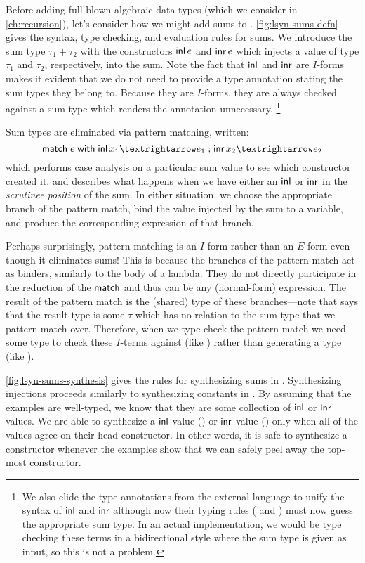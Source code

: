 Before adding full-blown algebraic data types (which we consider in \autoref{ch:recursion}), let's consider how we might add sums to \lsyn{}.
\autoref{fig:lsyn-sums-defn} gives the syntax, type checking, and evaluation rules for sums.
We introduce the sum type $τ_1 + τ_2$ with the constructors $\minl{e}$ and $\minr{e}$ which injects a value of type $τ_1$ and $τ_2$, respectively, into the sum.
Note the fact that $\minl{\!}$ and $\minr{\!}$ are $I$-forms makes it evident that we do not need to provide a type annotation stating the sum types they belong to.
Because they are $I$-forms, they are always checked against a sum type which renders the annotation unnecessary.%
\footnote{%
  We also elide the type annotations from the external language to unify the syntax of $\minl{\!}$ and $\minr{\!}$ although now their typing rules ( and ) must now guess the appropriate sum type.
  In an actual implementation, we would be type checking these terms in a bidirectional style where the sum type is given as input, so this is not a problem.
}

Sum types are eliminated via pattern matching, written:
\[
  \mmatch\;e\;\mwith\;\minl{x_1} → e_1 \semisep \minr{x_2} → e_2
\]
which performs case analysis on a particular sum value to see which constructor created it.
 and  describes what happens when we have either an $\minl{\!}$ or $\minr{\!}$ in the \emph{scrutinee position} of the sum.
In either situation, we choose the appropriate branch of the pattern match, bind the value injected by the sum to a variable, and produce the corresponding expression of that branch.

Perhaps surprisingly, pattern matching is an $I$ form rather than an $E$ form even though it eliminates sums!
This is because the branches of the pattern match act as binders, similarly to the body of a lambda.
They do not directly participate in the reduction of the $\mathsf{match}$ and thus can be any (normal-form) expression.
The result of the pattern match is the (shared) type of these branches---note that  says that the result type is some $τ$ which has no relation to the sum type that we pattern match over.
Therefore, when we type check the pattern match we need some type to check these $I$-terms against (like ) rather than generating a type (like ).



\autoref{fig:lsyn-sums-synthesis} gives the rules for synthesizing sums in \lsyn{}.
Synthesizing injections proceeds similarly to synthesizing constants in \lsyn{}.
By assuming that the examples are well-typed, we know that they are some collection of $\minl{\!}$ or $\minr{\!}$ values.
We are able to synthesize a $\minl{\!}$ value () or $\minr{\!}$ value () only when all of the values agree on their head constructor.
In other words, it is safe to synthesize a constructor whenever the examples show that we can safely peel away the top-most constructor.

